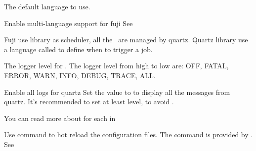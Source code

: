 \begin{Configuration}
{        \begin{NestedList}
            \item[language]{
                \item[]

                \begin{NestedList}
                    \item[default\_language]{
                        The default language to use.

                        \begin{tips}{Enable multi-language support for fuji}
                            See~
                        \end{tips}
                    }

                \end{NestedList}

            }
        \end{NestedList}

        \begin{NestedList}
            \item[quartz]{
                Fuji use  library as scheduler, all the~ are managed by quartz.
                Quartz library use a language called  to define when to trigger a job.

                \begin{NestedList}
                    \item[logger\_level]
                    The logger level for .
                    The logger level from high to low are: OFF, FATAL, ERROR, WARN, INFO, DEBUG, TRACE, ALL.

                    \begin{example}{Enable all logs for quartz}
                        Set the value to  to display all the messages from quartz.
                        It's recommended to set at least  level, to avoid .
                    \end{example}

                \end{NestedList}

            }
        \end{NestedList}


    }

\end{Configuration}

\clearpage
{}
You can read more about  for each  in 

\begin{tips}{Use  command to hot reload the configuration files.}
    The  command is provided by .
    See~
\end{tips}
